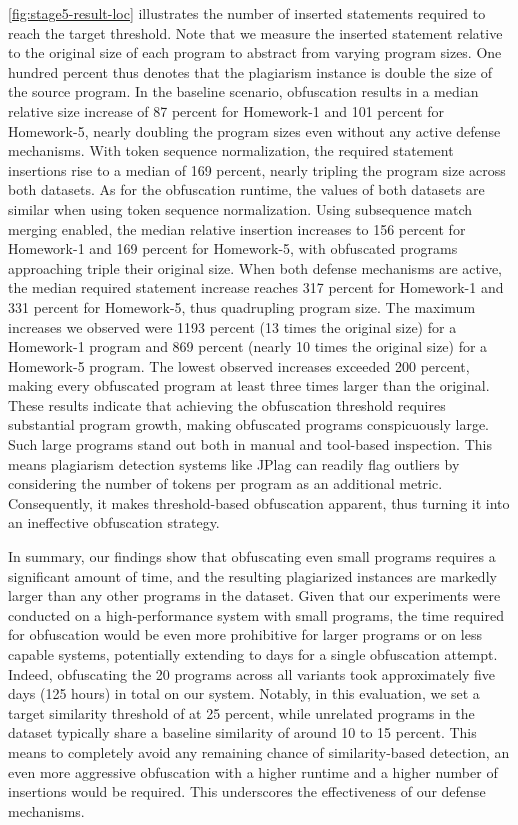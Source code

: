 \autoref{fig:stage5-result-loc} illustrates the number of inserted statements required to reach the target threshold. Note that we measure the inserted statement relative to the original size of each program to abstract from varying program sizes. One hundred percent thus denotes that the plagiarism instance is double the size of the source program.
%
In the baseline scenario, obfuscation results in a median relative size increase of 87 percent for Homework-1 and 101 percent for Homework-5, nearly doubling the program sizes even without any active defense mechanisms.
%
With token sequence normalization, the required statement insertions rise to a median of 169 percent, nearly tripling the program size across both datasets. As for the obfuscation runtime, the values of both datasets are similar when using token sequence normalization.
%
Using subsequence match merging enabled, the median relative insertion increases to 156 percent for Homework-1 and 169 percent for Homework-5, with obfuscated programs approaching triple their original size.
When both defense mechanisms are active, the median required statement increase reaches 317 percent for Homework-1 and 331 percent for Homework-5, thus quadrupling program size.
The maximum increases we observed were 1193 percent (13 times the original size) for a Homework-1 program and 869 percent (nearly 10 times the original size) for a Homework-5 program.
The lowest observed increases exceeded 200 percent, making every obfuscated program at least three times larger than the original.
%
These results indicate that achieving the obfuscation threshold requires substantial program growth, making obfuscated programs conspicuously large. Such large programs stand out both in manual and tool-based inspection. This means plagiarism detection systems like JPlag can readily flag outliers by considering the number of tokens per program as an additional metric.
Consequently, it makes threshold-based obfuscation apparent, thus turning it into an ineffective obfuscation strategy.

In summary, our findings show that obfuscating even small programs requires a significant amount of time, and the resulting plagiarized instances are markedly larger than any other programs in the dataset. Given that our experiments were conducted on a high-performance system with small programs, the time required for obfuscation would be even more prohibitive for larger programs or on less capable systems, potentially extending to days for a single obfuscation attempt. Indeed, obfuscating the 20 programs across all variants took approximately five days (125 hours) in total on our system.
%
Notably, in this evaluation, we set a target similarity threshold of \mossad at 25 percent, while unrelated programs in the dataset typically share a baseline similarity of around 10 to 15 percent. This means to completely avoid any remaining chance of similarity-based detection, an even more aggressive obfuscation with a higher runtime and a higher number of insertions would be required.
This underscores the effectiveness of our defense mechanisms.

